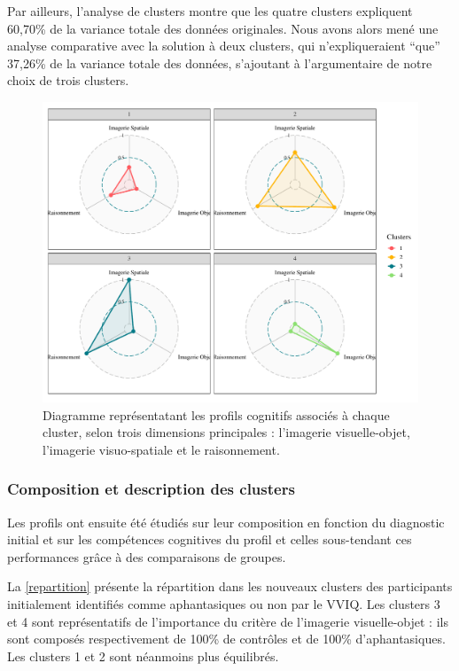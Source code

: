 \documentclass[
  12pt,
]{article}
\begin{document}
Par ailleurs, l'analyse de clusters montre que les quatre clusters
expliquent 60,70\% de la variance totale des données originales. Nous
avons alors mené une analyse comparative avec la solution à deux
clusters, qui n'expliqueraient ``que'' 37,26\% de la variance totale des
données, s'ajoutant à l'argumentaire de notre choix de trois clusters.

\begin{figure}[h]

\includegraphics[width=1\textwidth,height=0.5\textheight]{aphantasia_quarto_files/figure-pdf/radar-1.pdf}

\caption{Diagramme représentatant les profils cognitifs associés à chaque cluster, selon  trois dimensions principales : l'imagerie visuelle-objet, l'imagerie visuo-spatiale et le raisonnement.}
\label{radar}
\end{figure}

\hypertarget{composition-et-description-des-clusters}{%
\subsubsection{Composition et description des
clusters}\label{composition-et-description-des-clusters}}

Les profils ont ensuite été étudiés sur leur composition en fonction du
diagnostic initial et sur les compétences cognitives du profil et celles
sous-tendant ces performances grâce à des comparaisons de groupes.

La \autoref{repartition} présente la répartition dans les nouveaux
clusters des participants initialement identifiés comme aphantasiques ou
non par le VVIQ. Les clusters 3 et 4 sont représentatifs de l'importance
du critère de l'imagerie visuelle-objet : ils sont composés
respectivement de 100\% de contrôles et de 100\% d'aphantasiques. Les
clusters 1 et 2 sont néanmoins plus équilibrés.
\end{document}
